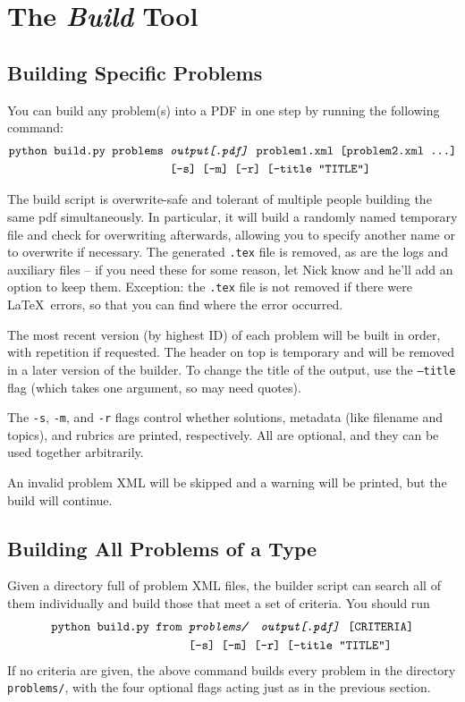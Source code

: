 \section{The \textit{Build} Tool}
  \subsection{Building Specific Problems}
    You can build any problem(s) into a PDF in one step by running the following command:
    \begin{align*}\texttt{python build.py }\texttt{problems }&\texttt{\textit{output[.pdf]} problem1.xml [problem2.xml \dots]}\\
        ~&\texttt{[-s] [-m] [-r] [--title ``TITLE'']}\end{align*}
    
    The build script is overwrite-safe and tolerant of multiple people building the same pdf simultaneously. In particular, it will build a randomly named temporary file and check for overwriting afterwards, allowing you to specify another name or to overwrite if necessary. The generated \texttt{.tex} file is removed, as are the logs and auxiliary files -- if you need these for some reason, let Nick know and he'll add an option to keep them. Exception: the \texttt{.tex} file is not removed if there were \LaTeX\ errors, so that you can find where the error occurred.
    
    The most recent version (by highest ID) of each problem will be built in order, with repetition if requested. The header on top is temporary and will be removed in a later version of the builder. To change the title of the output, use the \texttt{--title} flag (which takes one argument, so may need quotes).
    
    The \texttt{-s}, \texttt{-m}, and \texttt{-r} flags control whether solutions, metadata (like filename and topics), and rubrics are printed, respectively. All are optional, and they can be used together arbitrarily.
    
    An invalid problem XML will be skipped and a warning will be printed, but the build will continue.
    
  \subsection{Building All Problems of a Type}
    Given a directory full of problem XML files, the builder script can search all of them individually and build those that meet a set of criteria. You should run
    \begin{align*}\texttt{python build.py }\texttt{from }&\texttt{\textit{problems/\ \ output[.pdf]} [CRITERIA]}\\~&\texttt{[-s] [-m] [-r] [--title ``TITLE'']}\end{align*}
    If no criteria are given, the above command builds every problem in the directory \texttt{problems/}, with the four optional flags acting just as in the previous section.
    
